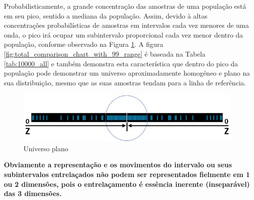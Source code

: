 
Probabilisticamente, a grande concentração das amostras de uma população está em seu pico, sentido a mediana da população. Assim, devido à altas concentrações probabilísticas de amostras em intervalos cada vez menores de uma onda, o pico irá ocupar um subintervalo proporcional cada vez menor dentro da população, conforme observado na Figura \ref{fig:consciousness_flat_universe}. A figura \ref{fig:total_comparison_chart_with_99_range} é baseada na Tabela \ref{tab:10000_all} e também demonstra esta característica que dentro do pico da população pode demonstrar um universo aproximadamente homogéneo e plano na sua distribuição, mesmo que as suas amostras tendam para a linha de referência.   
	\begin{figure}[H]
	\caption{Universo plano}
	\label{fig:consciousness_flat_universe}
	\centering
	\includegraphics[scale=.6]{sections/images/consciousness_flat_universe.jpg}
	\end{figure}

\textbf{Obviamente a representação e os movimentos do intervalo ou seus subintervalos entrelaçados não podem ser representados fielmente em 1 ou 2 dimensões, pois o entrelaçamento é essência inerente (inseparável) das 3 dimensões.} 

